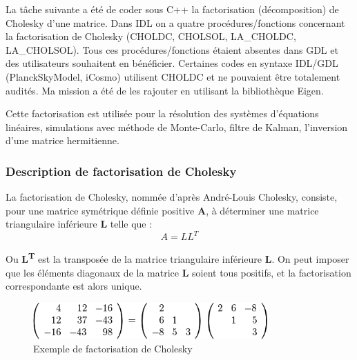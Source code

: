 \vspace{1\baselineskip}\vspace{-\parskip}

La tâche suivante a été de coder sous C++ la factorisation (décomposition) de
Cholesky d'une matrice. Dans IDL on a quatre procédures/fonctions concernant la
factorisation de Cholesky (CHOLDC, CHOLSOL, LA\_CHOLDC, LA\_CHOLSOL). Tous ces
procédures/fonctions étaient absentes dans GDL et des utilisateurs souhaitent en
bénéficier. Certaines codes en syntaxe IDL/GDL (PlanckSkyModel, iCosmo)
utilisent CHOLDC et ne pouvaient être totalement audités. Ma mission a été de
les rajouter en utilisant la bibliothèque Eigen.

Cette factorisation est utilisée pour la résolution des systèmes d'équations linéaires, simulations avec méthode de Monte-Carlo, filtre de Kalman, l'inversion d'une matrice hermitienne.\\

\subsubsection{Description de factorisation de Cholesky}

\vspace{1\baselineskip}\vspace{-\parskip}

La factorisation de Cholesky, nommée d'après André-Louis Cholesky, consiste, pour une matrice symétrique définie positive \textbf{A}, à déterminer une matrice triangulaire inférieure \textbf{L} telle que :
\begin{equation}
	A=LL^T
  	\label{form:cholesky}
\end{equation}

Ou \textbf{L\textsuperscript{T}} est la transposée de la matrice triangulaire inférieure \textbf{L}. On peut imposer que les éléments diagonaux de la matrice \textbf{L} soient tous positifs, et la factorisation correspondante est alors unique.\\

\begin{figure}[!ht]
    \centerline{
    	\includegraphics[width=0.8\textwidth]{./images/ex_chol.png}
    	}
    \caption{Exemple de factorisation de Cholesky}
    \label{ex_chol}
\end{figure}

